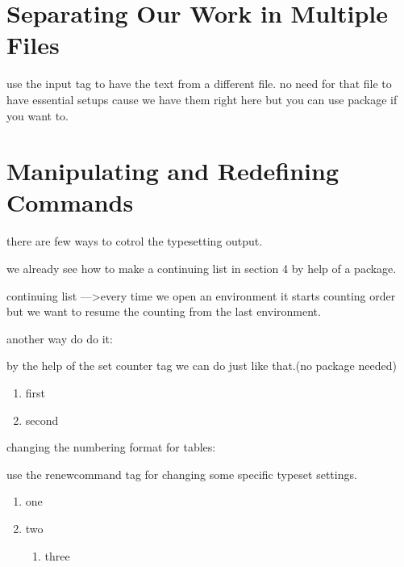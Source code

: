 \documentclass{article} %
\begin{document}
\section{Separating Our Work in Multiple Files}
    
    use the input tag to have the text from a different file. no need for that file to have essential setups cause we have them right here but you can use package if you want to.
    
    
    
    
\section{Manipulating and Redefining Commands}

    there are few ways to cotrol the typesetting output.
    
    \noindent we already see how to make a continuing list in section 4 by help of a package.
    
    \noindent continuing list ---\textgreater \space every time we open an environment it starts counting order but we want to resume the counting from the last environment.


    \noindent another way do do it:
    
    \noindent by the help of the set counter tag we can do just like that.(no package needed) 

    \begin{enumerate}
        \item first
    \end{enumerate}
    
    \begin{enumerate}
    
        \setcounter{enumi}{1}
    
        \item second
    \end{enumerate}

    \noindent changing the numbering format for tables:
    
    \noindent use the renewcommand tag for changing some specific typeset settings.
    
    \renewcommand{\theenumi}{\Alph{enumi}}
    \renewcommand{\theenumii}{\Roman{enumii}}
    \begin{enumerate}
        \item one
        \item two
        \begin{enumerate}
            \item three
        \end{enumerate}
    \end{enumerate}
    
\end{document}
